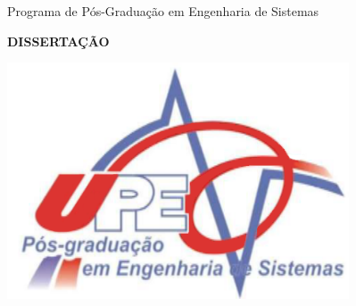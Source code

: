 \begin{titlepage}



\begin{figure}[h]
{}
\qquad \quad \quad \quad \quad \quad \quad
{}
\qquad \quad \quad \quad \quad \quad \quad
{}
\end{figure}

\begin{center}

{\Large Programa de Pós-Graduação em Engenharia de Sistemas} \\ \vspace{1ex}

\vspace{1.0in}

{\Large \textbf{ DISSERTAÇÃO}}

\vspace{0.1in}

\includegraphics[height=70mm]{Figuras/Capa/logo_ppges3.png}


\end{center}
\end{titlepage}
